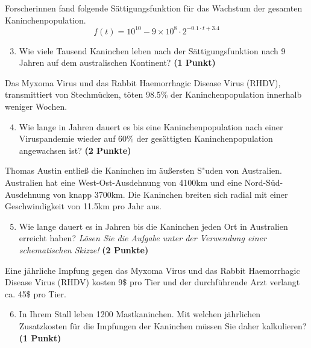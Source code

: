\documentclass[a4paper, 9pt]{scrartcl}\usepackage[]{graphicx}\usepackage[]{xcolor}
\begin{document}
Forscherinnen fand folgende S{\"a}ttigungsfunktion f{\"u}r das Wachstum der gesamten
Kaninchenpopulation.
\begin{equation*}
  f(t) = \ensuremath{10^{10}} - \ensuremath{9\times 10^{8}} \cdot 2^{-0.1 \cdot t + 3.4}
\end{equation*}

\begin{enumerate}
  \setcounter{enumi}{2}
\item Wie viele Tausend Kaninchen leben nach der S{\"a}ttigungsfunktion
  nach 9 Jahren auf dem australischen Kontinent? \textbf{(1
    Punkt)}
\end{enumerate}

Das Myxoma Virus und das Rabbit Haemorrhagic Disease Virus (RHDV),
transmittiert von Stechm{\"u}cken, t{\"o}ten 98.5\% der
Kaninchenpopulation innerhalb weniger Wochen. 

\begin{enumerate}
  \setcounter{enumi}{3}  
\item Wie lange in Jahren dauert es bis eine Kaninchenpopulation nach einer
  Viruspandemie wieder auf 60\% der ges{\"a}ttigten
  Kaninchenpopulation angewachsen ist?  \textbf{(2 Punkte)}
\end{enumerate}

Thomas Austin entlie{\ss} die Kaninchen im {\"a}u{\ss}ersten S{"u}den von
Australien. Australien hat eine West-Ost-Ausdehnung von 4100km
und eine Nord-S{\"u}d-Ausdehnung von knapp 3700km. Die Kaninchen
breiten sich radial mit einer Geschwindigkeit von 11.5km pro
Jahr aus.

\begin{enumerate}
  \setcounter{enumi}{4}
\item Wie lange dauert es in Jahren bis die Kaninchen jeden Ort
  in Australien erreicht haben? \textit{L{\"o}sen Sie die Aufgabe unter der
    Verwendung einer schematischen Skizze!} \textbf{(2 Punkte)}
\end{enumerate}

Eine j{\"a}hrliche Impfung gegen das Myxoma Virus und das Rabbit Haemorrhagic
Disease Virus (RHDV) kosten 9\$ pro Tier und der
durchf{\"u}hrende Arzt verlangt ca. 45\$ pro Tier.

\begin{enumerate}
  \setcounter{enumi}{5}
\item In Ihrem Stall leben 1200 Mastkaninchen. Mit welchen
  j{\"a}hrlichen Zusatzkosten f{\"u}r die Impfungen der Kaninchen m{\"u}ssen Sie daher
  kalkulieren? \textbf{(1 Punkt)}
\end{enumerate}
 
\end{document}
